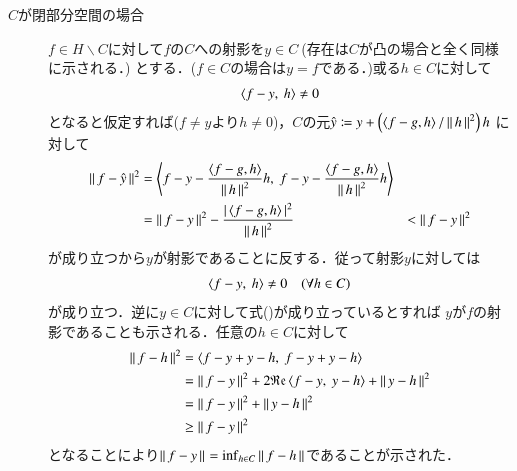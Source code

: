 \begin{prf}
\begin{description}
	\item[$C$が閉部分空間の場合]
		$f \in H \backslash C$に対して$f$の$C$への射影を$y \in C\ $(存在は$C$が凸の場合と全く同様に示される．)
		とする．($f \in C$の場合は$y = f$である．)或る$h \in C$に対して
		\begin{align}
			\inprod<f -y,\ h> \neq 0
		\end{align}
		となると仮定すれば($f \neq y$より$h \neq 0$)，$C$の元$\hat{y} \coloneqq y + \left(\inprod<f - g,h>/\Norm{h}{}^2\right)h$
		に対して
		\begin{align}
			\Norm{f - \hat{y}}{}^2 
			&= \inprod<f - y - \frac{\inprod<f - g,h>}{\Norm{h}{}^2}h,\ f - y - \frac{\inprod<f - g,h>}{\Norm{h}{}^2}h> \\
			&= \Norm{f-y}{}^2 - \frac{|\inprod<f - g,h>|^2}{\Norm{h}{}^2}
			&< \Norm{f-y}{}^2
		\end{align}
		が成り立つから$y$が射影であることに反する．従って射影$y$に対しては
		\begin{align}
			\inprod<f -y,\ h> \neq 0 \quad (\forall h \in C) \label{eq:projection}
		\end{align}
		が成り立つ．逆に$y \in C$に対して式()が成り立っているとすれば
		$y$が$f$の射影であることも示される．任意の$h \in C$に対して
		\begin{align}
			\Norm{f - h}{}^2 &= \inprod<f - y + y - h,\ f - y + y - h> \\
			&= \Norm{f - y}{}^2 + 2 \Re{\inprod<f - y,\ y - h>} + \Norm{y - h}{}^2 \\
			&= \Norm{f - y}{}^2 + \Norm{y - h}{}^2 \\
			&\geq \Norm{f - y}{}^2
		\end{align}
		となることにより$\left\|\, f - y\, \right\|_{} = \operatorname*{inf}_{h \in C} \left\|\, f - h\, \right\|_{}$であることが示された．
	\end{description}
\end{prf}
